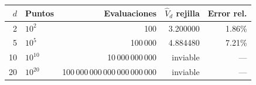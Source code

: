 \begin{tabular}{rlrrr}
\toprule
$d$ & Puntos & Evaluaciones & $\hat V_d$ rejilla & Error rel. \\
\midrule
2 & $10^{2}$ & 100 & 3.200000 & 1.86\% \\
5 & $10^{5}$ & 100\,000 & 4.884480 & 7.21\% \\
10 & $10^{10}$ & 10\,000\,000\,000 & inviable & --- \\
20 & $10^{20}$ & 100\,000\,000\,000\,000\,000\,000 & inviable & --- \\
\bottomrule
\end{tabular}
